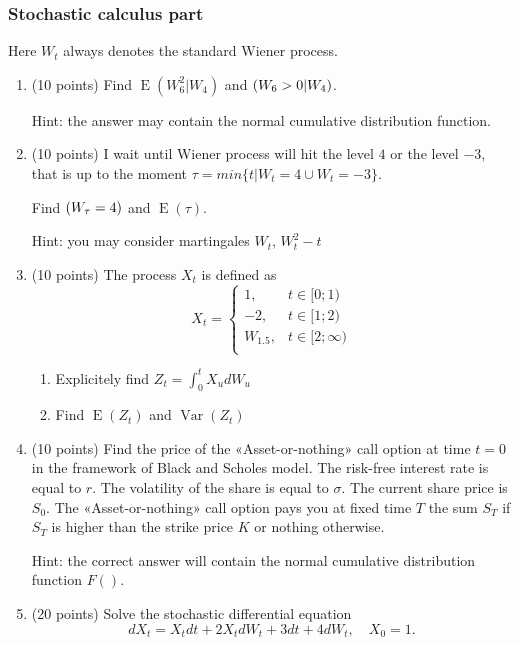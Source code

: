 \documentclass[12pt, a4paper]{article}
\DeclareMathOperator{\Var}{Var}
\DeclareMathOperator{\E}{E}
\let\P\relax
\DeclareMathOperator{\P}{\mathbb{P}}
\begin{document}
\subsubsection*{Stochastic calculus part}

Here $W_t$ always denotes the standard Wiener process.

\vspace{10pt}

\begin{enumerate}


\item (10 points) Find $\E(W_6^2|W_4)$ and $\P(W_6>0|W_4)$.

Hint: the answer may contain the normal cumulative distribution function.

\item (10 points) I wait until Wiener process will hit the level $4$ or the level $-3$, that is up to the moment $\tau=min\{t|W_{t}=4 \cup W_{t}=-3\}$.

Find $\P(W_{\tau}=4)$ and $\E(\tau)$.

Hint: you may consider martingales $W_{t}$, $W_{t}^2-t$


\item (10 points) The process $X_t$ is defined as
\[
X_{t}=\begin{cases}
1, & t\in[0;1) \\
-2, & t\in[1;2) \\
W_{1.5},& t\in[2;\infty) \\
\end{cases}
\]

\begin{enumerate}
\item Explicitely find $Z_t = \int_{0}^{t}X_{u}dW_{u}$
\item Find $\E(Z_t)$ and $\Var(Z_t)$
\end{enumerate}


\item (10 points) Find the price of the «Asset-or-nothing» call option at time $t=0$ in the framework of Black and Scholes model. The risk-free interest rate is equal to $r$. The volatility of the share is equal to $\sigma$. The current share price is $S_0$. The «Asset-or-nothing» call option pays you at fixed time $T$ the sum $S_T$ if $S_T$ is higher than the strike price $K$ or nothing otherwise.

Hint: the correct answer will contain the normal cumulative distribution function $F()$.

\item (20 points) Solve the stochastic differential equation
\[
dX_t = X_t dt + 2X_t dW_t + 3 dt + 4 dW_t, \quad X_0 = 1.
\]


\end{enumerate}
\end{document}
